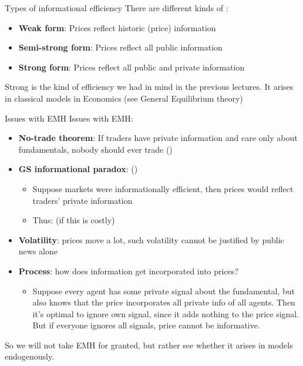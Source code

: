 \documentclass[english,10pt
,aspectratio=169
]{beamer}
\begin{document}
\begin{frame}{Types of informational efficiency}
	There are different kinds of :
	\begin{itemize}
		\item \textbf{Weak form}: Prices reflect historic (price) information
		\item \textbf{Semi-strong form}: Prices reflect all public information
		\item \textbf{Strong form}: Prices reflect all public and private information
	\end{itemize}
	Strong is the kind of efficiency we had in mind in the previous lectures. It arises in classical models in Economics (see General Equilibrium theory)
\end{frame}


\begin{frame}{Issues with EMH}
Issues with EMH:
\begin{itemize}[<+->]
	\item \textbf{No-trade theorem}: If traders have private information and care only about fundamentals, nobody should ever trade (\cite{milgrom_information_1982})
	\item \textbf{GS informational paradox}: (\cite{grossman_impossibility_1980})
	\begin{itemize}
		\item Suppose markets were informationally efficient, then prices would reflect traders' private information
		\item Thus:  (if this is costly)
	\end{itemize} 
	\item \textbf{Volatility}: prices move a lot, such volatility cannot be justified by public news alone
	\item \textbf{Process}: \alert{how} does information get incorporated into prices?
	\begin{itemize}
		\item Suppose every agent has some private signal about the fundamental, but also knows that the price incorporates all private info of all agents. Then it's optimal to ignore own signal, since it adds nothing to the price signal. But if everyone ignores all signals, price cannot be informative.
	\end{itemize}
\end{itemize}
\pause[8]
So we will not take EMH for granted, but rather see whether it arises in models endogenously.
\end{frame}
\end{document}
